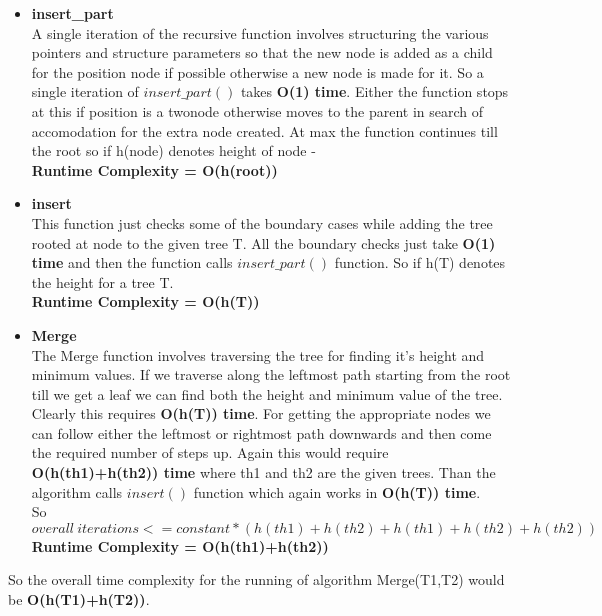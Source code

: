 \documentclass[20pt]{article}
\begin{document}
\begin{itemize}
\item \textbf{insert\_part} \\
A single iteration of the recursive function involves structuring the various pointers and structure parameters so that the new node is added as a child for the position node if possible otherwise a new node is made for it. So a single iteration of $insert\_part()$ takes \textbf{O(1) time}. Either the function stops at this if position is a twonode otherwise moves to the parent in search of accomodation for the extra node created. At max the function continues till the root so if h(node) denotes height of node -\\
\textbf{Runtime Complexity = O(h(root))}
\item \textbf{insert} \\
This function just checks some of the boundary cases while adding the tree rooted at node to the given tree T. All the boundary checks just take \textbf{O(1) time} and then the function calls $insert\_part()$ function. So if h(T) denotes the height for a tree T. \\
\textbf{Runtime Complexity = O(h(T))}
\item \textbf{Merge} \\
The Merge function involves traversing the tree for finding it's height and minimum values. If we traverse along the leftmost path starting from the root till we get a leaf we can find both the height and minimum value of the tree. Clearly this requires \textbf{O(h(T)) time}. For getting the appropriate nodes we can follow either the leftmost or rightmost path downwards and then come the required number of steps up. Again this would require \textbf{O(h(th1)+h(th2)) time} where th1 and th2 are the given trees. Than the algorithm calls $insert()$ function which again works in \textbf{O(h(T)) time}. \\
So $overall~iterations <= constant * (h(th1)+h(th2)+h(th1)+h(th2)+h(th2))$ \\
\textbf{Runtime Complexity = O(h(th1)+h(th2))}
\end{itemize}

So the overall time complexity for the running of algorithm Merge(T1,T2) would be \textbf{O(h(T1)+h(T2))}.
\end{document}
